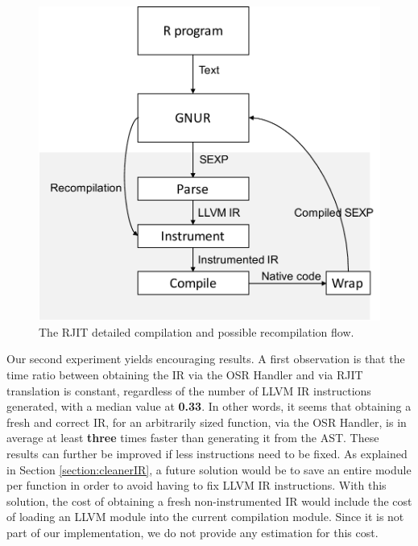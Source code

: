 \begin{figure}[h!]
\center
\includegraphics[scale=0.5]{Figures/RjitFlowRecomp}
\caption{The RJIT detailed compilation and possible recompilation flow.}
\label{fig:rjitrecompflow}
\end{figure}

Our second experiment yields encouraging results.
A first observation is that the time ratio between obtaining the IR via the OSR Handler and via RJIT translation is constant, regardless of the number of LLVM IR instructions generated, with a median value at \textbf{0.33}. 
In other words, it seems that obtaining a fresh and correct IR, for an arbitrarily sized function, via the OSR Handler, is in average at least \textbf{three} times faster than generating it from the AST.
These results can further be improved if less instructions need to be fixed.
As explained in Section \ref{section:cleanerIR}, a future solution would be to save an entire module per function in order to avoid having to fix LLVM IR instructions.
With this solution, the cost of obtaining a fresh non-instrumented IR would include the cost of loading an LLVM module into the current compilation module. 
Since it is not part of our implementation, we do not provide any estimation for this cost.\\


